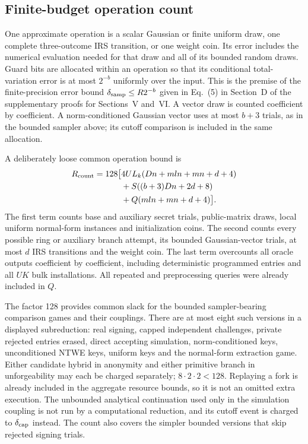 \documentclass[lettersize,journal]{IEEEtran}
\begin{document}
\subsection{Finite-budget operation count}
\label{app:budget-count}
One approximate operation is a scalar Gaussian or finite uniform draw, one
complete three-outcome IRS transition, or one weight coin. Its error includes
the numerical evaluation needed for that draw and all of its bounded random
draws. Guard bits are allocated within an operation so that its conditional
total-variation error is at most $2^{-b}$ uniformly over the input. This is the premise of the finite-precision error bound
$\delta_{\rm samp}\le R2^{-b}$ given in Eq.~(5) in Section~D
of the supplementary proofs for Sections~V and~VI. A vector draw is counted
coefficient by coefficient. A norm-conditioned Gaussian vector uses at most
$b+3$ trials, as in the bounded sampler above; its cutoff comparison is
included in the same allocation.

A deliberately loose common operation bound is
\begin{align*}
	R_{\rm count}=128\bigl[&4UL_k(Dn+mln+mn+d+4)\\
	&+S((b+3)Dn+2d+8)\\
	&+Q(mln+mn+d+4)\bigr].
\end{align*}
The first term counts base and auxiliary secret trials, public-matrix
draws, local uniform normal-form instances and initialization coins. The
second counts every possible ring or auxiliary branch attempt, its bounded
Gaussian-vector trials, at most $d$ IRS transitions and the weight coin.
The last term overcounts all oracle outputs coefficient by coefficient,
including deterministic programmed entries and all $UK$ bulk installations.
All repeated and preprocessing queries were already included in $Q$.

The factor 128 provides common slack for the bounded sampler-bearing
comparison games and their couplings. There are at most eight such
versions in a displayed subreduction: real signing, capped independent
challenges, private rejected entries erased, direct accepting simulation,
norm-conditioned keys, unconditioned NTWE keys, uniform keys and the
normal-form extraction game. Either candidate hybrid in anonymity and
either primitive branch in unforgeability may each be charged separately;
$8\cdot2\cdot2<128$. Replaying a fork is already included in the aggregate
resource bounds, so it is not an omitted extra execution. The unbounded
analytical continuation used only in the simulation coupling is not run
by a computational reduction, and its cutoff event is charged to
$\delta_{\rm cap}$ instead. The count also covers the simpler bounded
versions that skip rejected signing trials.
\end{document}
